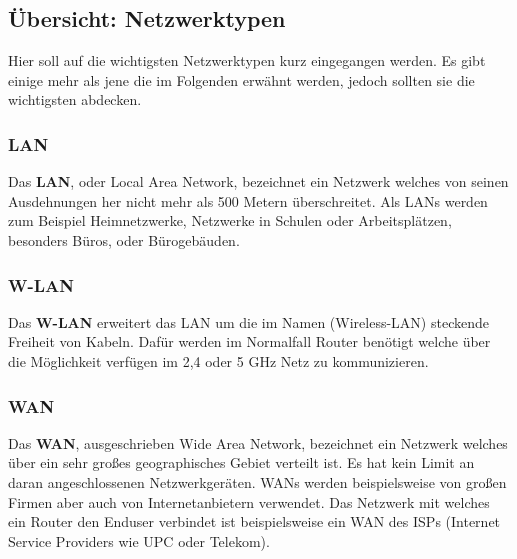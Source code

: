 \documentclass[12pt,a4paper]{report}
\begin{document}
\subsection{Übersicht: Netzwerktypen}
Hier soll auf die wichtigsten Netzwerktypen kurz eingegangen werden. Es gibt einige mehr als jene die im Folgenden erwähnt werden, jedoch sollten sie die wichtigsten abdecken.
\subsubsection{LAN}
Das \textbf{LAN}, oder Local Area Network, bezeichnet ein Netzwerk welches von seinen Ausdehnungen her nicht mehr als 500 Metern überschreitet. Als LANs werden zum Beispiel Heimnetzwerke, Netzwerke in Schulen oder Arbeitsplätzen, besonders Büros, oder Bürogebäuden.
\subsubsection{W-LAN}
Das \textbf{W-LAN} erweitert das LAN um die im Namen (Wireless-LAN) steckende Freiheit von Kabeln. Dafür werden im Normalfall Router benötigt welche über die Möglichkeit verfügen im 2,4 oder 5 GHz Netz zu kommunizieren.
\subsubsection{WAN}
Das \textbf{WAN}, ausgeschrieben Wide Area Network, bezeichnet ein Netzwerk welches über ein sehr großes geographisches Gebiet verteilt ist. Es hat kein Limit an daran angeschlossenen Netzwerkgeräten. WANs werden beispielsweise von großen Firmen aber auch von Internetanbietern verwendet. Das Netzwerk mit welches ein Router den Enduser verbindet ist beispielsweise ein WAN des ISPs (Internet Service Providers wie UPC oder Telekom). 
\end{document}
